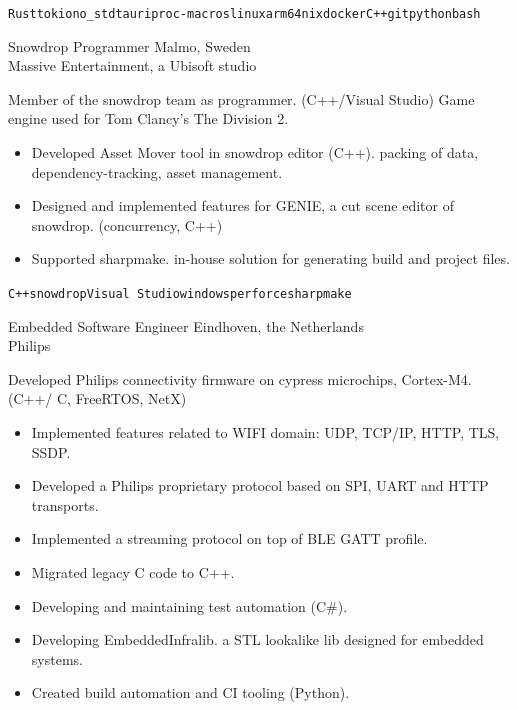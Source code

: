 \documentclass[9pt]{developercv} %
\begin{document}
\begin{entrylist}
{\begin{itemize}
          \end{itemize}
        \texttt{Rust}\slashsep\texttt{tokio}\slashsep\texttt{no\_std}\slashsep\texttt{tauri}\slashsep\texttt{proc-macros}\slashsep\texttt{linux}\slashsep\texttt{arm64}\slashsep\texttt{nix}\slashsep\texttt{docker}\slashsep\texttt{C++}\slashsep\texttt{git}\slashsep\texttt{python}\slashsep\texttt{bash}
        }
	\entry
		{}
		{Snowdrop Programmer}
		{Malmo, Sweden\\Massive Entertainment, a Ubisoft studio}
		{Member of the snowdrop team as programmer. (C++/Visual Studio) Game engine used for Tom Clancy's The Division 2.
          \begin{itemize}
           \setlength\itemsep{-0.5em}
            \item { Developed Asset Mover tool in snowdrop editor (C++). packing of data, dependency-tracking, asset management.}
            \item { Designed and implemented features for GENIE, a cut scene editor of snowdrop. (concurrency, C++) }
            \item { Supported sharpmake. in-house solution for generating build and
                project files. }
         \end{itemize}
        \texttt{C++}\slashsep\texttt{snowdrop}\slashsep\texttt{Visual Studio}\slashsep\texttt{windows}\slashsep\texttt{perforce}\slashsep\texttt{sharpmake}
        }
	\entry
		{}
        {Embedded Software Engineer}
        {Eindhoven, the Netherlands\\Philips}
        {Developed Philips connectivity firmware on cypress microchips, Cortex-M4.(C++/ C, FreeRTOS, NetX)
          \begin{itemize}
           \setlength\itemsep{-0.5em}
            \item {Implemented features related to WIFI domain: UDP, TCP/IP, HTTP, TLS, SSDP.}
            \item {Developed a Philips proprietary protocol based on SPI, UART and HTTP transports.}
            \item {Implemented a streaming protocol on top of BLE GATT profile.}
            \item {Migrated legacy C code to C++.}
            \item {Developing and maintaining test automation (C\#).}
            \item {Developing EmbeddedInfralib. a STL lookalike lib designed for embedded systems.}
            \item {Created build automation and CI tooling (Python).}

\end{itemize}}
\end{entrylist}
\end{document}
